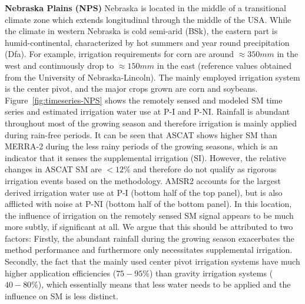 \documentclass[hess, manuscript]{copernicus}
\begin{document}
\textbf{Nebraska Plains (NPS)}
Nebraska is located in the middle of a transitional climate zone which extends longitudinal through the middle of the USA. While the climate in western Nebraska is cold semi-arid (BSk), the eastern part is humid-continental, characterized by hot summers and year round precipitation (Dfa). For example, irrigation requirements for corn are around $\approx 350mm$ in the west and continuously drop to $\approx 150mm$ in the east (reference values obtained from the University of Nebraska-Lincoln). The mainly employed irrigation system is the center pivot, and the major crops grown are corn and soybeans. Figure~\ref{fig:timeseries-NPS} shows the remotely sensed and modeled SM time series and estimated irrigation water use at P-I and P-NI. Rainfall is abundant throughout most of the growing season and therefore irrigation is mainly applied during rain-free periods. It can be seen that ASCAT shows higher SM than MERRA-2 during the less rainy periods of the growing seasons, which is an indicator that it senses the supplemental irrigation (SI). However, the relative changes in ASCAT SM are $< 12\%$ and therefore do not qualify as rigorous irrigation events based on the methodology. AMSR2 accounts for the largest derived irrigation water use at P-I (bottom half of the top panel), but is also afflicted with noise at P-NI (bottom half of the bottom panel). In this location, the influence of irrigation on the remotely sensed SM signal appears to be much more subtly, if significant at all. We argue that this should be attributed to two factors: Firstly, the abundant rainfall during the growing season exacerbates the method performance and furthermore only necessitates supplemental irrigation. Secondly, the fact that the mainly used center pivot irrigation systems have much higher application efficiencies ($75-95\%$) than gravity irrigation systems ($40-80\%$), which essentially means that less water needs to be applied and the influence on SM is less distinct.\\
\end{document}
